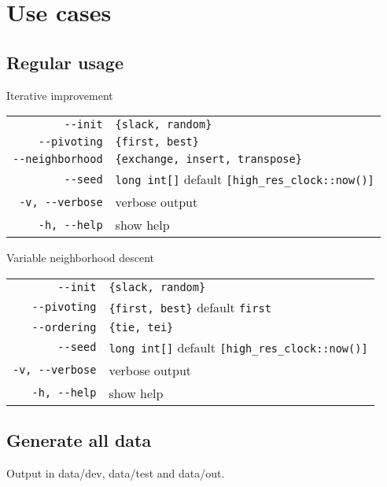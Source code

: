 \newpage\cleardoublepage{}
\section{Use cases}

\subsection{Regular usage}


Iterative improvement


\begin{tabular}{rl}
\verb!--init! & \verb!{slack, random}!\\
\verb!--pivoting! & \verb!{first, best}!\\
\verb!--neighborhood! & \verb!{exchange, insert, transpose}!\\
\verb!--seed! & \verb!long int[]! default \verb![high_res_clock::now()]!\\
\verb!-v, --verbose! & verbose output\\
\verb!-h, --help! & show help\\
\end{tabular}

Variable neighborhood descent



\begin{tabular}{rl}
\verb!--init! & \verb!{slack, random}!\\
\verb!--pivoting! & \verb!{first, best}! default \verb!first!\\
\verb!--ordering! & \verb!{tie, tei}!\\
\verb!--seed! & \verb!long int[]! default \verb![high_res_clock::now()]!\\
\verb!-v, --verbose! & verbose output\\
\verb!-h, --help! & show help\\
\end{tabular}




\subsection{Generate all data}

Output in data/dev, data/test and data/out.

